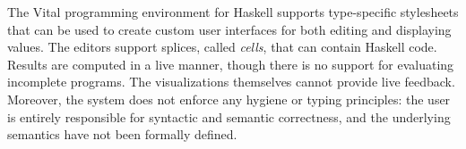 The Vital programming environment for Haskell \cite{hanna2002interactive} 
supports type-specific stylesheets
that can be used to create custom user interfaces for both editing and displaying
values. The editors support splices, called \emph{cells}, that can contain 
Haskell code. Results are computed in a live manner, though there is no support
for evaluating incomplete programs. The visualizations themselves cannot provide
live feedback. Moreover, the system does not enforce any hygiene or typing principles:
the user is entirely responsible for syntactic and semantic correctness, and the 
underlying semantics have not been formally defined.


